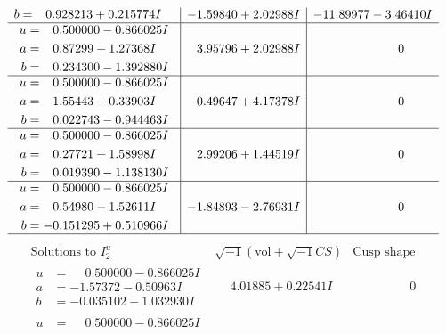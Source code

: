\documentclass[1p]{elsarticle_modified}
\theoremstyle{definition}
\newcommand{\I}{\sqrt{-1}}
\begin{document}
$$\begin{array}{c|c|c}
\begin{aligned}
b &= \phantom{-}0.928213 + 0.215774 I\end{aligned}
 & -1.59840 + 2.02988 I & -11.89977 - 3.46410 I \\ \hline\begin{aligned}
u &= \phantom{-}0.500000 - 0.866025 I \\
a &= \phantom{-}0.87299 + 1.27368 I \\
b &= \phantom{-}0.234300 - 1.392880 I\end{aligned}
 & \phantom{-}3.95796 + 2.02988 I & \phantom{-0.000000 } 0 \\ \hline\begin{aligned}
u &= \phantom{-}0.500000 - 0.866025 I \\
a &= \phantom{-}1.55443 + 0.33903 I \\
b &= \phantom{-}0.022743 - 0.944463 I\end{aligned}
 & \phantom{-}0.49647 + 4.17378 I & \phantom{-0.000000 } 0 \\ \hline\begin{aligned}
u &= \phantom{-}0.500000 - 0.866025 I \\
a &= \phantom{-}0.27721 + 1.58998 I \\
b &= \phantom{-}0.019390 - 1.138130 I\end{aligned}
 & \phantom{-}2.99206 + 1.44519 I & \phantom{-0.000000 } 0 \\ \hline\begin{aligned}
u &= \phantom{-}0.500000 - 0.866025 I \\
a &= \phantom{-}0.54980 - 1.52611 I \\
b &= -0.151295 + 0.510966 I\end{aligned}
 & -1.84893 - 2.76931 I & \phantom{-0.000000 } 0\\
 \hline 
 \end{array}$$\newpage$$\begin{array}{c|c|c}  
\text{Solutions to }I^u_{2}& \I (\text{vol} + \sqrt{-1}CS) & \text{Cusp shape}\\
 \hline 
\begin{aligned}
u &= \phantom{-}0.500000 - 0.866025 I \\
a &= -1.57372 - 0.50963 I \\
b &= -0.035102 + 1.032930 I\end{aligned}
 & \phantom{-}4.01885 + 0.22541 I & \phantom{-0.000000 } 0 \\ \hline\begin{aligned}
u &= \phantom{-}0.500000 - 0.866025 I \\

\end{aligned}
\end{array}$$
\end{document}
